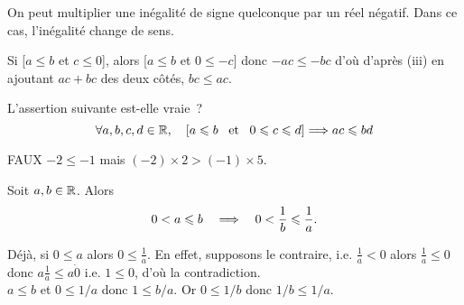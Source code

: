 \documentclass{magnoliaold}
\begin{document}
\begin{remarqueUnique}
\remarque On peut multiplier une inégalité de signe quelconque par un réel
  négatif. Dans ce cas, l'inégalité change de sens.
\begin{sol}
Si [$a\leq b$ et $c\leq 0$], alors [$a\leq b$ et $0\leq -c$] donc $-ac\leq -bc$ d'où d'après (iii) en ajoutant $ac+bc$ des deux côtés, $bc\leq ac$.
\end{sol}  
  
\end{remarqueUnique}

\begin{exoUnique}
\exo L'assertion suivante est-elle vraie~?
  \[\forall a,b,c,d\in\mathbb{R} ,\quad\left[a\leqslant b \quad\!\text{et}\quad\! 0\leqslant c\leqslant d\right]\Longrightarrow
    ac\leqslant bd\]
\end{exoUnique}
\begin{sol}
FAUX $-2\leq -1$ mais $(-2)\times 2 > (-1)\times 5$.
\end{sol}

\begin{proposition}
Soit $a,b\in\mathbb{R}$. Alors
\[0<a\leqslant b \quad\Longrightarrow\quad 0<\frac{1}{b}\leqslant\frac{1}{a}.\]
\end{proposition}

\begin{preuve}
Déjà, si $0\leq a$ alors $0\leq \frac{1}{a}$. En effet, supposons le contraire, i.e. $\frac{1}{a}<0$ alors $\frac{1}{a}\leq 0$ donc $a\frac{1}{a}\leq a\dot 0$ i.e. $1\leq 0$, d'où la contradiction.\\

$a\leq b$ et $0\leq 1/a$ donc $1\leq b/a$. Or $0\leq 1/b$ donc $1/b\leq 1/a$.

\end{preuve}
\end{document}

